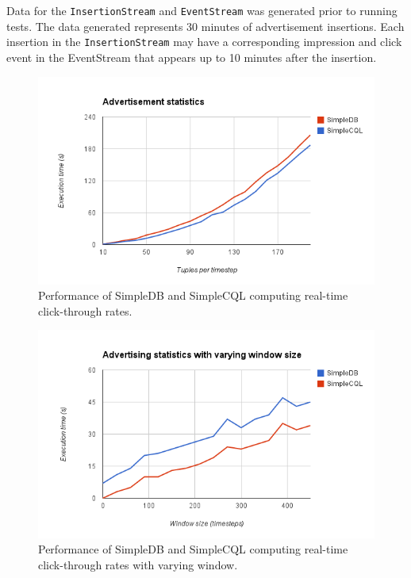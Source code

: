 \documentclass[a4paper, 10pt, conference]{IEEEconf}
\begin{document}
Data for the \texttt{InsertionStream} and \texttt{EventStream} was generated prior to running tests.  The data generated represents 30 minutes of advertisement insertions.  Each insertion in the \texttt{InsertionStream} may have a corresponding impression and click event in the EventStream that appears up to 10 minutes after the insertion.

\begin{figure}[h!]
    \centering
    \centerline{\includegraphics[totalheight=5cm]{ads.png}}
    \caption{Performance of SimpleDB and SimpleCQL computing real-time click-through rates.}
    \label{fig:ads}
\end{figure}

\begin{figure}[h!]
    \centering
    \centerline{\includegraphics[totalheight=5cm]{ads_window.png}}
    \caption{Performance of SimpleDB and SimpleCQL computing real-time click-through rates with varying window.}
    \label{fig:ads_window}
\end{figure}
\end{document}
